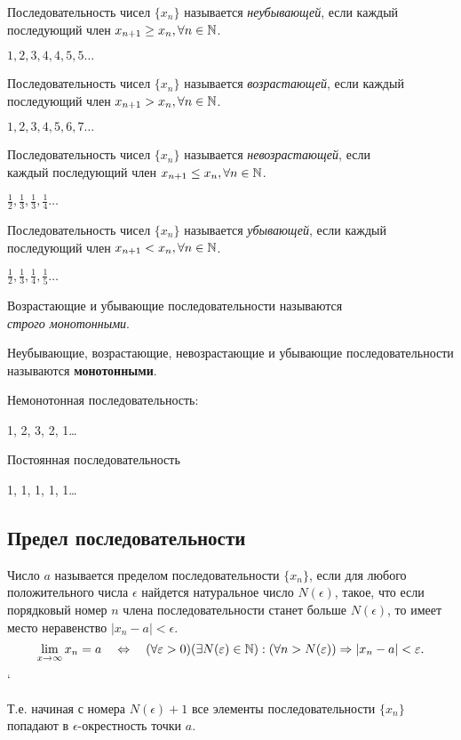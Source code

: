 Последовательность чисел $\{x_{n}\}$ называется \textit{неубывающей}, если каждый последующий член $x_{n+1} \ge x_{n}, \forall n\in \mathbb{N}$.
\begin{eg}
  $1, 2, 3, 4, 4, 5, 5\ldots$
\end{eg}

Последовательность чисел $\{x_{n}\} $ называется \textit{возрастающей}, если каждый последующий член $x_{n+1} > x_{n}, \forall n \in \mathbb{N}$.
\begin{eg}
  $1, 2, 3, 4, 5, 6, 7\ldots$
\end{eg}

Последовательность чисел $\{x_{n}\} $ называется \textit{невозрастающей}, если \\ каждый последующий член $x_{n+1} \le x_{n}, \forall n \in \mathbb{N}$.
\begin{eg}
  $\frac{1}{2}, \frac{1}{3}, \frac{1}{3}, \frac{1}{4}\ldots $
\end{eg}

Последовательность чисел $\{x_{n}\} $ называется \textit{убывающей}, если каждый последующий член $x_{n+1} < x_{n}, \forall n \in \mathbb{N}$.
\begin{eg}
  $\frac{1}{2}, \frac{1}{3}, \frac{1}{4}, \frac{1}{5}\ldots$
\end{eg}

Возрастающие и убывающие последовательности называются \\ \textit{строго монотонными}.

Неубывающие, возрастающие, невозрастающие и убывающие последовательности называются \textbf{монотонными}.

Немонотонная последовательность:
\begin{eg}
  1, 2, 3, 2, 1\ldots
\end{eg}

Постоянная последовательность
\begin{eg}
  1, 1, 1, 1, 1\ldots
\end{eg}

\subsection{Предел последовательности}

\begin{definition}
Число $a$ называется пределом последовательности $\{x_{n}\} $, если для любого положительного числа $\epsilon$ найдется натуральное число  $N\left(\epsilon  \right) $, такое, что если порядковый номер $n$ члена последовательности станет больше $N(\epsilon)$, то имеет место неравенство  $|x_{n} - a| < \epsilon$.
\[
\lim_{x \to \infty} x_{n} = a \quad \iff \quad
(\forall \epsilon > 0)(\exists N(\epsilon) \in \N) : (\forall n > N(\epsilon)) \implies |x_{n}-a| < \epsilon
.\] `
\end{definition}
\begin{note}
  Т.е. начиная с номера $N(\epsilon) + 1$ все элементы последовательности $\{x_{n}\} $ попадают в $\epsilon$-окрестность точки $a$.
\end{note}

